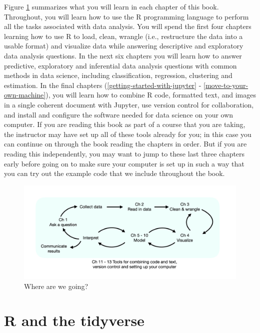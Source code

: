 \documentclass[
]{book}
\begin{document}
Figure \ref{fig:img-chapter-overview} summarizes what you will learn in each chapter
of this book.
Throughout, you will learn how to use the R programming language \citep{Rlanguage} to perform
all the tasks associated with data analysis. You will
spend the first four chapters learning how to use R to load, clean, wrangle
(i.e., restructure the data into a usable format) and visualize data
while answering descriptive and exploratory data analysis questions. In the next
six chapters you will learn how to answer predictive, exploratory and inferential
data analysis questions with common methods in data science, including
classification, regression, clustering and estimation.
In the final chapters
(\ref{getting-started-with-jupyter} - \ref{move-to-your-own-machine}),
you will learn how to combine R code, formatted text, and images
in a single coherent document with Jupyter, use version control for
collaboration, and install and configure the software needed for data science
on your own computer. If you are reading this book as part of a course that you are
taking, the instructor may have set up all of these tools already for you; in this
case you can continue on through the book reading the chapters in order.
But if you are reading this independently, you may want to jump to these last three chapters
early before going on to make sure your computer is set up in such a way that you can
try out the example code that we include throughout the book.

\begin{figure}
\includegraphics[width=1\linewidth]{img/chapter_overview} \caption{Where are we going?}\label{fig:img-chapter-overview}
\end{figure}

\hypertarget{intro}{%
\chapter{R and the tidyverse}\label{intro}}
\end{document}
